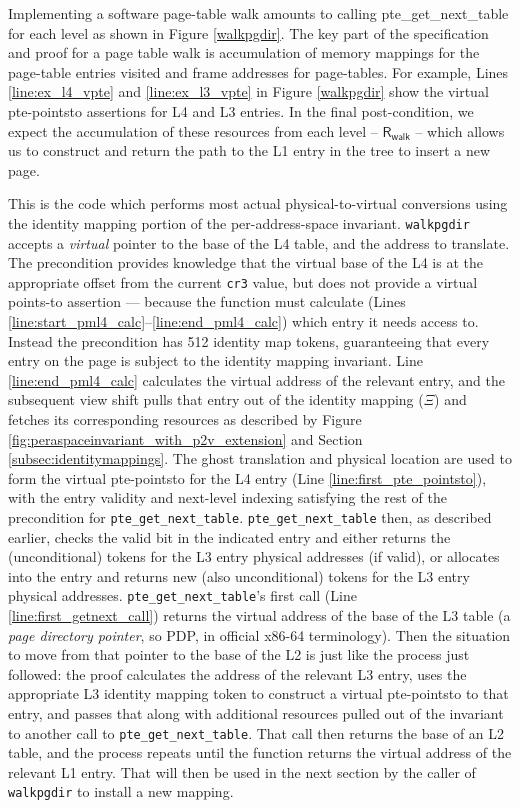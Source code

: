 Implementing a software page-table walk amounts to calling \textsf{pte\_get\_next\_table} for each level as shown in Figure \ref{walkpgdir}. 
The key part of the specification and proof for a page table walk is accumulation of memory mappings for the page-table entries 
visited and frame addresses for page-tables. 
For example, Lines \ref{line:ex_l4_vpte} and \ref{line:ex_l3_vpte} in Figure \ref{walkpgdir} show the virtual pte-pointsto assertions for L4 and L3 entries.
In the final post-condition, we expect the accumulation of these resources from each level -- $\textsf{R}_{\textsf{walk}}$ -- 
which allows us to construct and return the path to the L1 entry in the tree to insert a new page.  

This is the code which performs most actual physical-to-virtual conversions using the identity mapping portion of the per-address-space invariant.
\lstinline|walkpgdir| accepts a \emph{virtual} pointer to the base of the L4 table, and the address to translate.
The precondition provides knowledge that the virtual base of the L4 is at the appropriate offset from the current \lstinline|cr3| value,
but does not provide a virtual points-to assertion --- because the function must calculate (Lines \ref{line:start_pml4_calc}--\ref{line:end_pml4_calc})
which entry it needs access to.
Instead the precondition has 512 identity map tokens, guaranteeing that every entry on the page is subject to the identity mapping invariant.
Line \ref{line:end_pml4_calc} calculates the virtual address of the relevant entry, and the subsequent view shift
pulls that entry out of the identity mapping ($\Xi$) and fetches its corresponding resources as
described by Figure \ref{fig:peraspaceinvariant_with_p2v_extension} and Section \ref{subsec:identitymappings}.
The ghost translation and physical location are used to form the virtual pte-pointsto for the L4 entry
(Line \ref{line:first_pte_pointsto}), with the entry validity and next-level indexing
satisfying the rest of the precondition for \lstinline|pte_get_next_table|.
\lstinline|pte_get_next_table| then, as described earlier, checks the valid bit in the indicated
entry and either returns the (unconditional) tokens for the L3 entry physical addresses (if valid), or
allocates into the entry and returns new (also unconditional) tokens for the L3 entry physical addresses.
\lstinline|pte_get_next_table|'s first call (Line \ref{line:first_getnext_call}) returns
the virtual address of the base of the L3 table (a \emph{page directory pointer}, so PDP, in official
x86-64 terminology). Then the situation to move from that pointer to the base of the L2
is just like the process just followed: the proof calculates the address of the relevant
L3 entry, uses the appropriate L3 identity mapping token to construct a virtual pte-pointsto to that entry,
and passes that along with additional resources pulled out of the invariant to another call to
\lstinline|pte_get_next_table|. That call then returns the base of an L2 table, and the process
repeats until the function returns the virtual address of the relevant L1 entry.
That will then be used in the next section by the caller of \lstinline|walkpgdir|
to install a new mapping.


